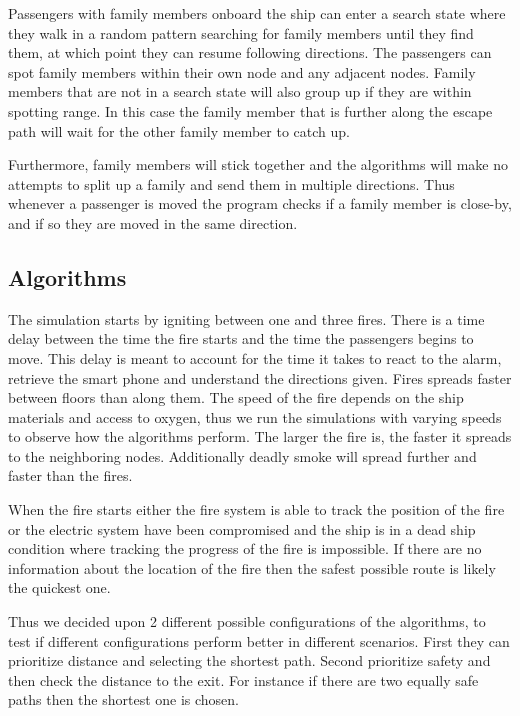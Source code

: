 Passengers with family members onboard the ship can enter a search state where they walk in a random pattern searching for family members until they find them, at which point they can resume following directions. The passengers can spot family members within their own node and any adjacent nodes. Family members that are not in a search state will also group up if they are within spotting range. In this case the family member that is further along the escape path will wait for the other family member to catch up.

Furthermore, family members will stick together and the algorithms will make no attempts to split up a family and send them in multiple directions. Thus whenever a passenger is moved the program checks if a family member is close-by, and if so they are moved in the same direction.

\subsection{Algorithms}
The simulation starts by igniting between one and three fires. There is a time delay between the time the fire starts and the time the passengers begins to move. This delay is meant to account for the time it takes to react to the alarm, retrieve the smart phone and understand the directions given. Fires spreads faster between floors than along them. The speed of the fire depends on the ship materials and access to oxygen, thus we run the simulations with varying speeds to observe how the algorithms perform. The larger the fire is, the faster it spreads to the neighboring nodes. Additionally deadly smoke will spread further and faster than the fires. 

When the fire starts either the fire system is able to track the position of the fire or the electric system have been compromised and the ship is in a dead ship condition where tracking the progress of the fire is impossible. If there are no information about the location of the fire then the safest possible route is likely the quickest one. 

Thus we decided upon 2 different possible configurations of the algorithms, to test if different configurations perform better in different scenarios. First they can prioritize distance and selecting the shortest path. Second prioritize safety and then check the distance to the exit. For instance if there are two equally safe paths then the shortest one is chosen.

